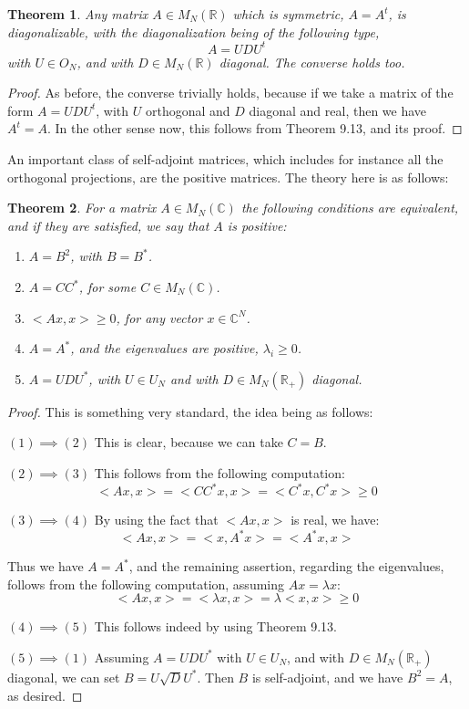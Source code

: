 \documentclass[12pt]{amsbook}
\newtheorem{theorem}{Theorem}[chapter]
\begin{document}
\begin{theorem}
Any matrix $A\in M_N(\mathbb R)$ which is symmetric, $A=A^t$, is diagonalizable, with the diagonalization being of the following type,
$$A=UDU^t$$
with $U\in O_N$, and with $D\in M_N(\mathbb R)$ diagonal. The converse holds too.
\end{theorem}

\begin{proof}
As before, the converse trivially holds, because if we take a matrix of the form $A=UDU^t$, with $U$ orthogonal and $D$ diagonal and real, then we have $A^t=A$. In the other sense now, this follows from Theorem 9.13, and its proof.
\end{proof}

An important class of self-adjoint matrices, which includes for instance all the orthogonal projections, are the positive matrices. The theory here is as follows:

\begin{theorem}
For a matrix $A\in M_N(\mathbb C)$ the following conditions are equivalent, and if they are satisfied, we say that $A$ is positive:
\begin{enumerate}
\item $A=B^2$, with $B=B^*$.

\item $A=CC^*$, for some $C\in M_N(\mathbb C)$.

\item $<Ax,x>\geq0$, for any vector $x\in\mathbb C^N$.

\item $A=A^*$, and the eigenvalues are positive, $\lambda_i\geq0$.

\item $A=UDU^*$, with $U\in U_N$ and with $D\in M_N(\mathbb R_+)$ diagonal.
\end{enumerate}
\end{theorem}

\begin{proof}
This is something very standard, the idea being as follows:

\medskip

$(1)\implies(2)$ This is clear, because we can take $C=B$.

\medskip

$(2)\implies(3)$ This follows from the following computation:
$$<Ax,x>
=<CC^*x,x>
=<C^*x,C^*x>
\geq0$$

$(3)\implies(4)$ By using the fact that $<Ax,x>$ is real, we have:
$$<Ax,x>
=<x,A^*x>
=<A^*x,x>$$

Thus we have $A=A^*$, and the remaining assertion, regarding the eigenvalues, follows from the following computation, assuming $Ax=\lambda x$:
$$<Ax,x>
=<\lambda x,x>
=\lambda<x,x>
\geq0$$

$(4)\implies(5)$ This follows indeed by using Theorem 9.13.

\medskip

$(5)\implies(1)$ Assuming $A=UDU^*$ with $U\in U_N$, and with $D\in M_N(\mathbb R_+)$ diagonal, we can set $B=U\sqrt{D}U^*$. Then $B$ is self-adjoint, and we have $B^2=A$, as desired.
\end{proof}
\end{document}

